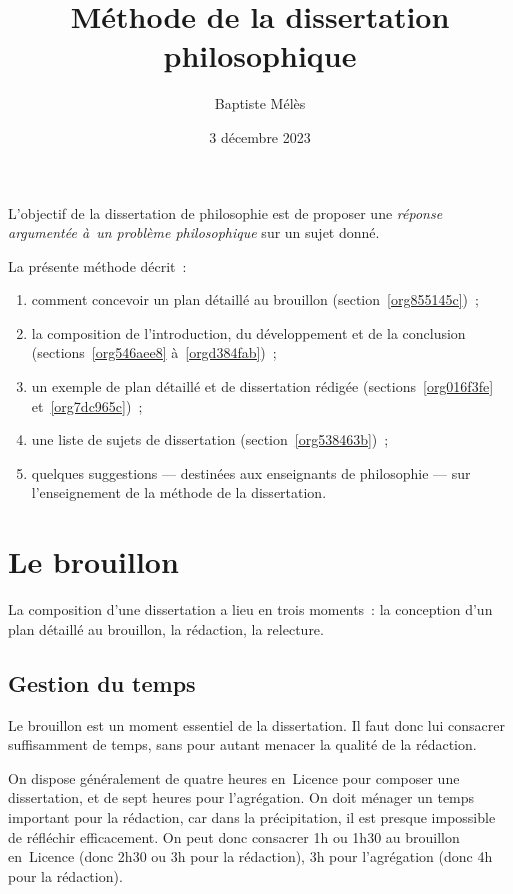 \documentclass[a4paper,12pt]{report}
\author{Baptiste Mélès}
\date{3 décembre 2023}
\title{Méthode de la dissertation philosophique}
\begin{document}
\maketitle
\bigskip

L'objectif de la dissertation de philosophie est de proposer une
\emph{réponse argumentée à un problème philosophique} sur un sujet donné.

La présente méthode décrit : 
\begin{enumerate}
\item comment concevoir un plan détaillé au brouillon (section \ref{org855145c}) ;
\item la composition de l'introduction, du développement et de la conclusion
(sections \ref{org546aee8} à \ref{orgd384fab}) ;
\item un exemple de plan détaillé et de dissertation rédigée
(sections \ref{org016f3fe} et \ref{org7dc965c}) ;
\item une liste de sujets de dissertation (section \ref{org538463b}) ;
\item quelques suggestions — destinées aux enseignants de philosophie — sur
l'enseignement de la méthode de la dissertation.
\end{enumerate}

\setcounter{tocdepth}{3}
\tableofcontents

\part{Le brouillon}
\label{sec:org6d67164}
\label{org855145c}

La composition d'une dissertation a lieu en trois moments : la
conception d'un plan détaillé au brouillon, la rédaction, la relecture.

\chapter{Gestion du temps}
\label{sec:org0661983}

Le brouillon est un moment essentiel de la dissertation. Il faut donc
lui consacrer suffisamment de temps, sans pour autant menacer la qualité
de la rédaction.

On dispose généralement de quatre heures en Licence pour composer une
dissertation, et de sept heures pour l'agrégation. On doit ménager un
temps important pour la rédaction, car dans la précipitation, il est
presque impossible de réfléchir efficacement. On peut donc consacrer 1h
ou 1h30 au brouillon en Licence (donc 2h30 ou 3h pour la rédaction), 3h
pour l'agrégation (donc 4h pour la rédaction).
\end{document}

